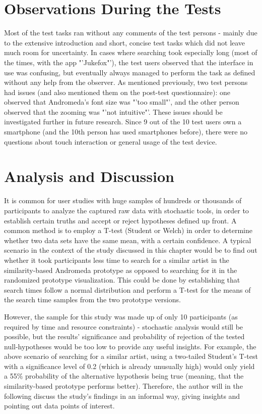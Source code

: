 \section{Observations During the Tests}

Most of the test tasks ran without any comments of the test persons - mainly due to the extensive introduction and short, concise test tasks which did not leave much room for uncertainty. In cases where searching took especially long (most of the times, with the app "'Jukefox"'), the test users observed that the interface in use was confusing, but eventually always managed to perform the task as defined without any help from the observer. As mentioned previously, two test persons had issues (and also mentioned them on the post-test questionnaire): one observed that Andromeda's font size was "'too small"', and the other person observed that the zooming was "'not intuitive"'. These issues should be investigated further in future research. Since 9 out of the 10 test users own a smartphone (and the 10th person has used smartphones before), there were no questions about touch interaction or general usage of the test device.

\section{Analysis and Discussion}

It is common for user studies with huge samples of hundreds or thousands of participants to analyze the captured raw data with stochastic tools, in order to establish certain truths and accept or reject hypotheses defined up front. A common method is to employ a T-test (Student or Welch) in order to determine whether two data sets have the same mean, with a certain confidence. A typical scenario in the context of the study discussed in this chapter would be to find out whether it took participants less time to search for a similar artist in the similarity-based Andromeda prototype as opposed to searching for it in the randomized prototype visualization. This could be done by establishing that search times follow a normal distribution and perform a T-test for the means of the search time samples from the two prototype versions.

However, the sample for this study was made up of only 10 participants (as required by time and resource constraints) - stochastic analysis would still be possible, but the results' significance and probability of rejection of the tested null-hypotheses would be too low to provide any useful insights. For example, the above scenario of searching for a similar artist, using a two-tailed Student's T-test with a significance level of 0.2 (which is already unusually high) would only yield a 55\% probability of the alternative hypothesis being true (meaning, that the similarity-based prototype performs better). Therefore, the author will in the following discuss the study's findings in an informal way, giving insights and pointing out data points of interest.

